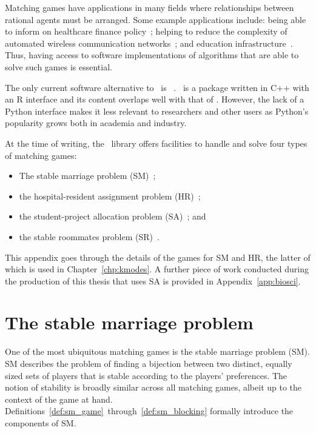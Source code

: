Matching games have applications in many fields where relationships between
rational agents must be arranged. Some example applications include: being able
to inform on healthcare finance policy~\cite{Agarwal2017}; helping to reduce the
complexity of automated wireless communication networks~\cite{Bayat2016}; and
education infrastructure~\cite{Chiarandini2019}. Thus, having access to software
implementations of algorithms that are able to solve such games is essential.

The only current software alternative to \matching\ is \matchingr~\cite{Tilly2018}.
\matchingr\ is a package written in C++ with an R interface and its content
overlaps well with that of \matching. However, the lack of a Python interface
makes it less relevant to researchers and other users as Python's popularity
grows both in academia and industry.

At the time of writing, the \matching\ library offers facilities to handle and
solve four types of matching games:

\begin{itemize}
    \item The stable marriage problem (SM)~\cite{Gale1962};
    \item the hospital-resident assignment problem
        (HR)~\cite{Gale1962,Roth1984};
    \item the student-project allocation problem (SA)~\cite{Abraham2007}; and
    \item the stable roommates problem (SR)~\cite{Irving1985}.
\end{itemize}

This appendix goes through the details of the games for SM and HR, the latter
of which is used in Chapter~\ref{chp:kmodes}. A further piece of work conducted
during the production of this thesis that uses SA is provided in
Appendix~\ref{app:biosci}.  %

\section{The stable marriage problem}

One of the most ubiquitous matching games is the stable marriage problem (SM).
SM describes the problem of finding a bijection between two distinct, equally
sized sets of players that is stable according to the players' preferences. The
notion of stability is broadly similar across all matching games, albeit up to
the context of the game at hand.
Definitions~\ref{def:sm_game}~through~\ref{def:sm_blocking} formally introduce
the components of SM.

